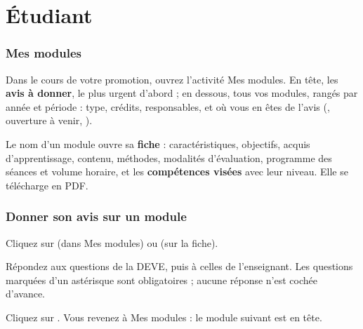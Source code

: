 \documentclass[11pt,a4paper]{article}
\begin{document}
\newpage
\part{Étudiant}\label{part:etudiant}

\section{Mes modules}

Dans le cours de votre promotion, ouvrez l'activité \og Mes modules\fg{}. En tête, les
\textbf{avis à donner}, le plus urgent d'abord ; en dessous, tous vos modules, rangés par
année et période : type, crédits, responsables, et où vous en êtes de l'avis
(, ouverture à venir, ).


Le nom d'un module ouvre sa \textbf{fiche} : caractéristiques, objectifs, acquis
d'apprentissage, contenu, méthodes, modalités d'évaluation, programme des séances et volume
horaire, et les \textbf{compétences visées} avec leur niveau. Elle se télécharge en PDF.



\section{Donner son avis sur un module}

\begin{etapes}
  \item Cliquez sur  (dans \og Mes modules\fg{}) ou 
    (sur la fiche).
  \item Répondez aux questions de la DEVE, puis à celles de l'enseignant. Les questions
    marquées d'un astérisque sont obligatoires ; aucune réponse n'est cochée d'avance.
  \item Cliquez sur . Vous revenez à \og Mes modules\fg{} : le
    module suivant est en tête.
\end{etapes}

\end{document}
